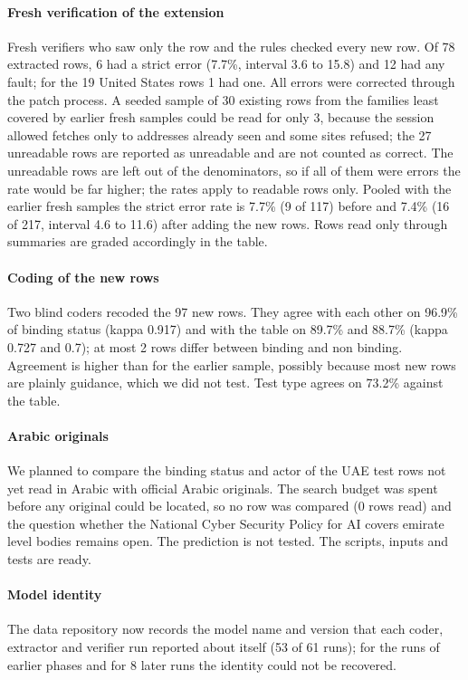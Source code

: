\documentclass[conference]{IEEEtran}
\begin{document}
\paragraph{Fresh verification of the extension} Fresh verifiers who saw only the row and the rules checked every new row. Of 78 extracted rows, 6 had a strict error (7.7\%, interval 3.6 to 15.8) and 12 had any fault; for the 19 United States rows 1 had one. All errors were corrected through the patch process. A seeded sample of 30 existing rows from the families least covered by earlier fresh samples could be read for only 3, because the session allowed fetches only to addresses already seen and some sites refused; the 27 unreadable rows are reported as unreadable and are not counted as correct. The unreadable rows are left out of the denominators, so if all of them were errors the rate would be far higher; the rates apply to readable rows only. Pooled with the earlier fresh samples the strict error rate is 7.7\% (9 of 117) before and 7.4\% (16 of 217, interval 4.6 to 11.6) after adding the new rows. Rows read only through summaries are graded accordingly in the table.

\paragraph{Coding of the new rows} Two blind coders recoded the 97 new rows. They agree with each other on 96.9\% of binding status (kappa 0.917) and with the table on 89.7\% and 88.7\% (kappa 0.727 and 0.7); at most 2 rows differ between binding and non binding. Agreement is higher than for the earlier sample, possibly because most new rows are plainly guidance, which we did not test. Test type agrees on 73.2\% against the table.

\paragraph{Arabic originals} We planned to compare the binding status and actor of the UAE test rows not yet read in Arabic with official Arabic originals. The search budget was spent before any original could be located, so no row was compared (0 rows read) and the question whether the National Cyber Security Policy for AI covers emirate level bodies remains open. The prediction is not tested. The scripts, inputs and tests are ready.

\paragraph{Model identity} The data repository now records the model name and version that each coder, extractor and verifier run reported about itself (53 of 61 runs); for the runs of earlier phases and for 8 later runs the identity could not be recovered.
\end{document}

